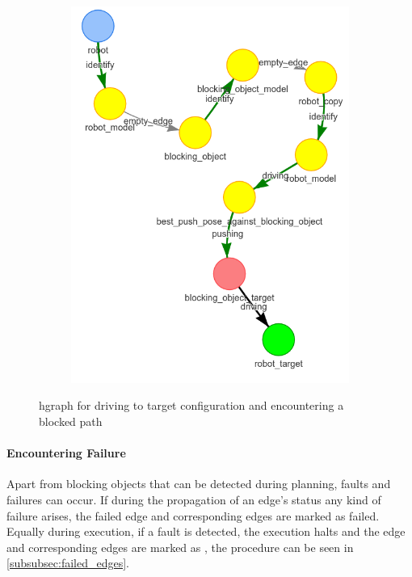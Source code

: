 \begin{figure}[H]
\begin{subfigure}{.3\textwidth}
    \caption{}\label{subfig:blocking_obj_5}
    \end{subfigure}
    \begin{subfigure}{.3\textwidth}
    \centering
    \includegraphics[width=\textwidth]{figures/connecting_nodes/blocking_obj/blocking_obj_6}
    \caption{}\label{subfig:blocking_obj_6}
    \end{subfigure}
    \caption{\ac{hgraph} for driving to target configuration and encountering a blocked path}%
    \label{fig:blocking_obj_hgraph}
\end{figure}

\paragraph{Encountering Failure}%
 Apart from blocking objects that can be detected during planning, faults and failures can occur. If during the propagation of an edge's status any kind of failure arises, the failed edge and corresponding edges are marked as failed. Equally during execution, if a fault is detected, the execution halts and the edge and corresponding edges are marked as , the procedure can be seen in \cref{subsubsec:failed_edges}.\bs


